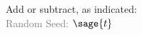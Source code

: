 \documentclass{article}%
\begin{document}

\noindent Add or subtract, as indicated: \\
\textcolor{gray}{Random Seed: $\sage{t}$}


\begin{enumerate}
\begin{multicols}{3}
\end{multicols}
\end{enumerate}


\newpage


\begin{multicols}{3}
\begin{enumerate}
\end{enumerate}
\end{multicols}
\end{document}
